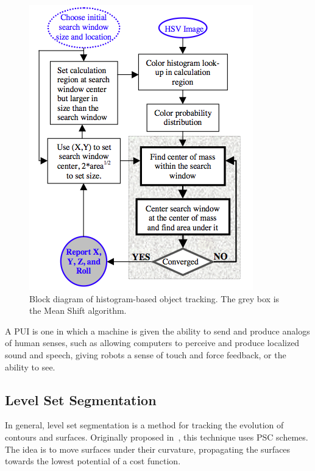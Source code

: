 \begin{figure}
\centering
\includegraphics[scale=0.6]{figures/colour_obj_tracking}
\caption[Block diagram of object tracking]{Block diagram of histogram-based object tracking. The grey box is the Mean Shift algorithm.%
}
\label{img:colour_obj_tracking}
\end{figure}

A \ac{PUI}  is one in which a machine is given the ability to send and produce analogs of human senses, such as allowing computers to perceive and produce localized sound and speech, giving robots a sense of touch and force feedback, or the ability to see.










\subsection{Level Set Segmentation}
\label{sec:level_set} 

In general, level set segmentation is a method for tracking the evolution of contours and surfaces. Originally proposed in~\cite{osher:1988}, this technique uses \ac{PSC} schemes. The idea is to move surfaces under their curvature, propagating the surfaces towards the lowest potential of a cost function.


